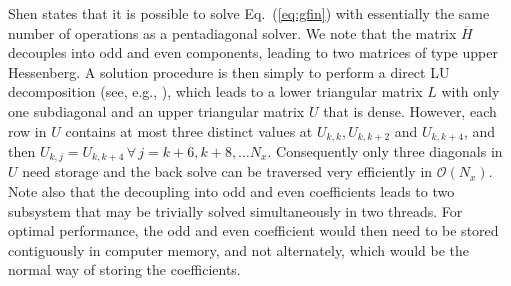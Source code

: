 \documentclass[11pt, oneside]{elsarticle}
\newcommand{\D}[1]{\overline{#1}}
\begin{document}
Shen \cite{Shen95} states that it is possible to solve Eq.~(\ref{eq:gfin}) 
with 
essentially the same number of operations as a pentadiagonal solver. We note 
that the matrix 
$\D{H}$ decouples into odd and even components, leading to two matrices of type upper Hessenberg. A solution
procedure is then simply to perform a direct LU decomposition (see, e.g., 
\cite{stewart98}), which leads to a 
lower triangular  
matrix $L$ with only one subdiagonal and an upper triangular matrix $U$ that 
is dense. However, each row in $U$ 
contains at most three distinct values at $U_{k,k}, U_{k,k+2}$ and $U_{k,k+4}$, 
and then $U_{k,j} = U_{k,k+4}\, \forall \, j = k+6, k+8, \ldots N_x$. 
Consequently 
only three diagonals in $U$ need storage and the back solve can be traversed 
very efficiently in $\mathcal{O}(N_x)$. Note also that the decoupling into 
odd and even coefficients leads to two subsystem that may be trivially 
solved simultaneously in two threads. For optimal 
performance, the odd and even coefficient would then need to be stored 
contiguously in computer memory, and not alternately, which would be the normal way of storing the coefficients.


\end{document}
